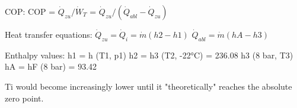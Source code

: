 COP:  
COP = \( \dot{Q}_{zu} / \dot{W}_T \) = \( \dot{Q}_{zu} / (\dot{Q}_{abl} - \dot{Q}_{zu}) \)  

Heat transfer equations:  
\( \dot{Q}_{zu} = \dot{Q}_i = \dot{m} (h2 - h1) \)  
\( \dot{Q}_{abl} = \dot{m} (hA - h3) \)  

Enthalpy values:  
h1 = h (T1, p1)  
h2 = h3 (T2, -22°C) = 236.08  
h3 (8 bar, T3)  
hA = hF (8 bar) = 93.42

Ti would become increasingly lower until it "theoretically" reaches the absolute zero point.
